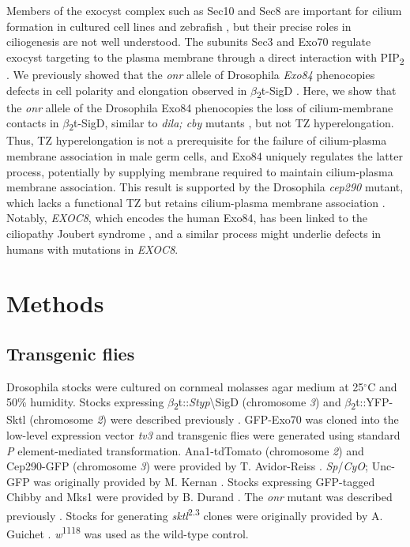 \documentclass[12pt, twoside, letterpaper]{article}
\newcommand{\PIP}{PIP\textsubscript{2}}
\newcommand{\sigd}{$\beta$\textsubscript{2}t-SigD}
\begin{document}
\begin{doublespacing}
\begin{linenumbers}
    Members of the exocyst complex such as Sec10 and Sec8 are
    important for cilium formation in cultured cell lines and zebrafish
    \citep{zuo2009exocyst, lobo2017exocyst, seixas2016arl13b},
    but their precise roles in ciliogenesis are not well understood.
    The subunits Sec3 and Exo70 regulate exocyst targeting to the plasma
    membrane through a direct interaction with \PIP{}
    \citep{he2007exo70, zhang2008membrane}.
    We previously showed that
    the \textit{onr} allele of Drosophila \textit{Exo84} phenocopies
    defects in cell polarity and elongation observed in \sigd{}
    \citep{fabian2010phosphatidylinositol}.
    Here, we show that the \textit{onr} allele of the Drosophila Exo84
    phenocopies the loss of cilium-membrane contacts in \sigd{}, similar to
    \textit{dila; cby} mutants \citep{vieillard2016transition},
    but not TZ hyperelongation.
    Thus, TZ hyperelongation is not a prerequisite for the failure of
    cilium-plasma membrane association in male germ cells,
    and Exo84 uniquely regulates the latter process,
    potentially by supplying membrane required to maintain cilium-plasma membrane
    association.
    This result is supported by the Drosophila \textit{cep290} mutant,
    which lacks a functional TZ but retains cilium-plasma membrane
    association \cite{basiri2014migrating}.
    Notably, \textit{EXOC8}, which encodes the human Exo84, has
    been linked to the ciliopathy Joubert syndrome
    \citep{dixon2012exome},
    and a similar process might underlie defects in humans with
    mutations in \textit{EXOC8}.

    \section*{Methods}
    \subsection*{Transgenic flies}
    Drosophila stocks were cultured on cornmeal molasses agar medium at 25$^{\circ}$C
    and 50\% humidity.
    Stocks expressing $\beta$\textsubscript{2}t::\textit{Styp}\textbackslash{SigD} (chromosome \textit{3}) and
    $\beta$\textsubscript{2}t::YFP-Sktl (chromosome \textit{2}) were described previously \citep{wei2008depletion}.
    GFP-Exo70 was cloned into the low-level expression vector \textit{tv3} \citep{wong2005pip2}
    and transgenic flies were generated using standard \textit{P} element-mediated transformation.
    Ana1-tdTomato (chromosome \textit{2}) and Cep290-GFP (chromosome \textit{3}) were provided
    by T. Avidor-Reiss \citep{basiri2014migrating}.
    \textit{Sp}/\textit{CyO}; Unc-GFP was originally provided by M. Kernan \citep{baker2004mechanosensory}.
    Stocks expressing GFP-tagged Chibby and Mks1 were
    provided by B. Durand \citep{enjolras2012drosophila, vieillard2016transition}.
    The \textit{onr} mutant was described previously \citep{giansanti2015exocyst}.
    Stocks for generating \textit{sktl}\textsuperscript{2.3} clones were originally provided by
    A. Guichet \citep{gervais2008pip5k}.
    \textit{w}\textsuperscript{1118} was used as the wild-type control.


\end{linenumbers}
\end{doublespacing}
\end{document}
